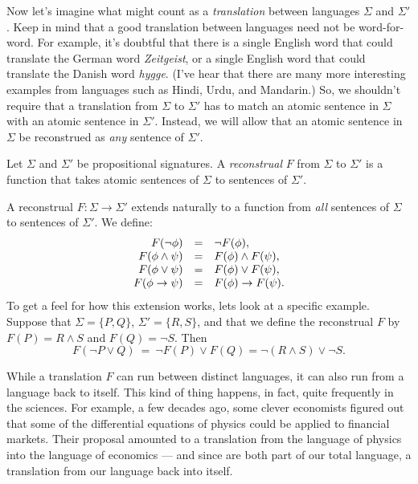 Now let's imagine what might count as a \emph{\gls{translation}}
 between languages $\Sigma$ and $\Sigma '$.  Keep
in mind that a good translation between languages need not be
word-for-word.  For example, it's doubtful that there is a single
English word that could translate the German word {\it Zeitgeist}, or
a single English word that could translate the Danish word {\it
  hygge}.  (I've hear that there are many more interesting examples
from languages such as Hindi, Urdu, and Mandarin.)  So, we shouldn't
require that a translation from $\Sigma$ to $\Sigma '$ has to match an
atomic sentence in $\Sigma$ with an atomic sentence in $\Sigma '$.
Instead, we will allow that an atomic sentence in $\Sigma$ be
reconstrued as {\it any} sentence of $\Sigma '$.

\begin{defn} Let $\Sigma$ and $\Sigma '$ be propositional signatures.
  A \emph{\gls{reconstrual}} $F$ from $\Sigma$ to $\Sigma '$ is a
  function that takes atomic sentences of $\Sigma$ to sentences of
  $\Sigma '$.  \end{defn}

A reconstrual $F:\Sigma\to\Sigma '$ extends naturally to a function
from {\it all} sentences of $\Sigma$ to sentences of $\Sigma '$.  We define:
\[ \begin{array}{r c l}
     F(\neg \phi ) & = & \neg F(\phi ) , \\
     F(\phi\wedge\psi ) & = & F(\phi )\wedge F(\psi ) , \\
     F(\phi\vee\psi ) & = & F(\phi )\vee F(\psi ) ,\\
     F(\phi\to\psi ) & = & F(\phi )\to F(\psi ) .\end{array} \] To get
 a feel for how this extension works, lets look at a specific example.  Suppose that $\Sigma = \{ P,Q\}$, $\Sigma '=\{ R,S\}$, and that we define the reconstrual $F$ by $F(P)=R\wedge S$ and $F(Q)=\neg S$. Then
\[ F(\neg P\vee Q ) \: = \: \neg F(P)\vee F(Q) =\neg (R\wedge S)\vee \neg S
  . \]

While a translation $F$ can run between distinct languages, it can
also run from a language back to itself.  This kind of thing happens,
in fact, quite frequently in the sciences.  For example, a few decades
ago, some clever economists figured out that some of the differential
equations of physics could be applied to financial markets.  Their
proposal amounted to a translation from the language of physics into
the language of economics --- and since are both part of our total
language, a translation from our language back into itself.

